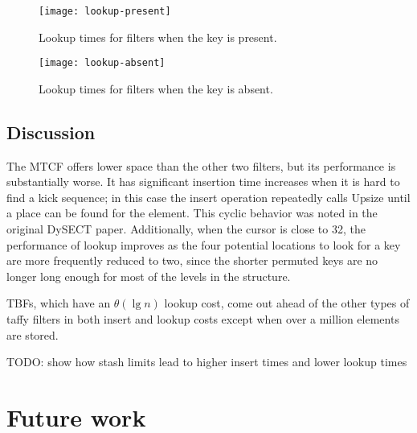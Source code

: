 \documentclass[manuscript,screen,review]{acmart}
\begin{document}
\begin{figure}
  \texttt{[image: lookup-present]}
  \caption{
    \label{lookup-present}
    Lookup times for filters when the key is present.
  }
\end{figure}

\begin{figure}
  \texttt{[image: lookup-absent]}
  \caption{
    \label{lookup-absent}
    Lookup times for filters when the key is absent.
  }
\end{figure}

\subsection{Discussion}

The MTCF offers lower space than the other two filters, but its performance is substantially worse.
It has significant insertion time increases when it is hard to find a kick sequence; in this case the insert operation repeatedly calls Upsize until a place can be found for the element.
This cyclic behavior was noted in the original DySECT paper. \cite{dysect}
Additionally, when the cursor is close to 32, the performance of lookup improves as the four potential locations to look for a key are more frequently reduced to two, since the shorter permuted keys are no longer long enough for most of the levels in the structure.

TBFs, which have an $\theta(\lg n)$ lookup cost, come out ahead of the other types of taffy filters in both insert and lookup costs except when over a million elements are stored.






TODO: show how stash limits lead to higher insert times and lower lookup times

\section{Future work}
\end{document}
